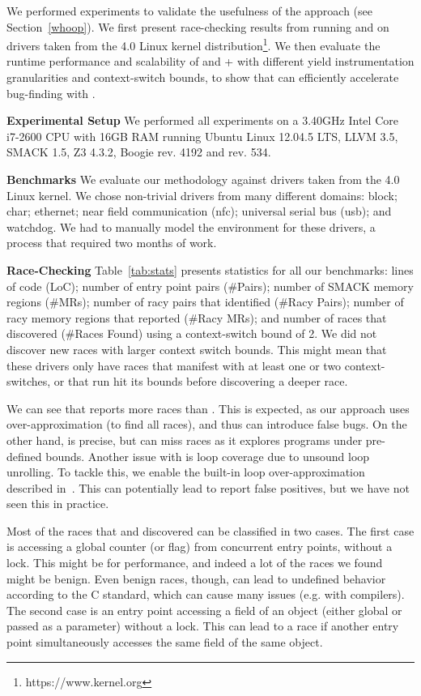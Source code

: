 We performed experiments to validate the usefulness of the \whoop approach (see Section~\ref{whoop}). We first present race-checking results from running \whoop and \corral on \sizeOfBenchmarks drivers taken from the 4.0 Linux kernel distribution\footnote{https://www.kernel.org}. We then evaluate the runtime performance and scalability of \corral and \whoop + \corral with different yield instrumentation granularities and context-switch bounds, to show that \whoop can efficiently accelerate bug-finding with \corral.

\noindent
\textbf{Experimental Setup}\xspace\xspace We performed all experiments on a 3.40GHz Intel Core i7-2600 CPU with 16GB RAM running Ubuntu Linux 12.04.5 LTS, LLVM 3.5, SMACK 1.5, Z3 4.3.2, Boogie rev. 4192 and \corral rev. 534.

\noindent
\textbf{Benchmarks}\xspace\xspace We evaluate our methodology against \sizeOfBenchmarks drivers taken from the 4.0 Linux kernel. We chose non-trivial drivers from many different domains: block; char; ethernet; near field communication (nfc); universal serial bus (usb); and watchdog. We had to manually model the environment for these drivers, a process that required two months of work.

\noindent
\textbf{Race-Checking}\xspace\xspace Table~\ref{tab:stats} presents statistics for all our benchmarks: lines of code (LoC); number of entry point pairs (\#Pairs); number of SMACK memory regions (\#MRs); number of racy pairs that \whoop identified (\#Racy Pairs); number of racy memory regions that \whoop reported (\#Racy MRs); and number of races that \corral discovered (\#Races Found) using a context-switch bound of 2. We did not discover new races with larger context switch bounds. This might mean that these drivers only have races that manifest with at least one or two context-switches, or that \corral run hit its bounds before discovering a deeper race.

We can see that \whoop reports more races than \corral. This is expected, as our approach uses over-approximation (to find all races), and thus can introduce false bugs. On the other hand, \corral is precise, but can miss races as it explores programs under pre-defined bounds. Another issue with \corral is loop coverage due to unsound loop unrolling. To tackle this, we enable the built-in loop over-approximation described in~\cite{lal2014powering}. This can potentially lead \corral to report false positives, but we have not seen this in practice.

Most of the races that \whoop and \corral discovered can be classified in two cases. The first case is accessing a global counter (or flag) from concurrent entry points, without a lock. This might be for performance, and indeed a lot of the races we found might be benign. Even benign races, though, can lead to undefined behavior according to the C standard, which can cause many issues (e.g. with compilers). The second case is an entry point accessing a field of an object (either global or passed as a parameter) without a lock. This can lead to a race if another entry point simultaneously accesses the same field of the same object.

